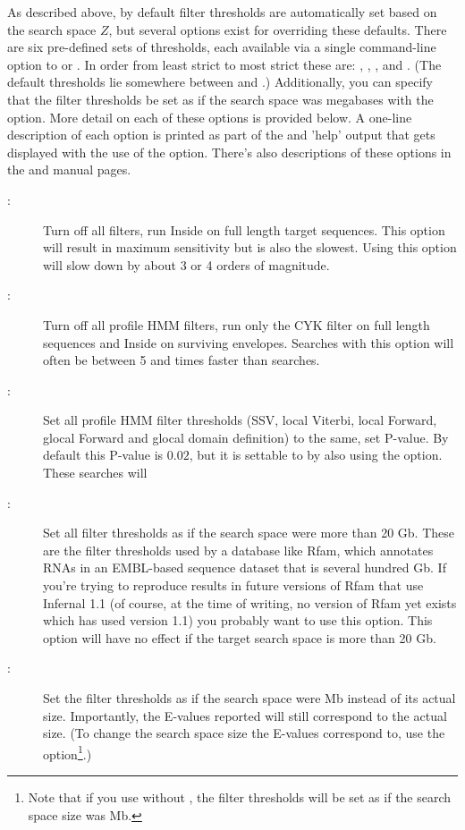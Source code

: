 As described above, by default filter thresholds are automatically set
based on the search space $Z$, but several options exist for
overriding these defaults. There are six pre-defined sets of
thresholds, each available via a single command-line option to
 or . In order from least strict to most
strict these are: , , , and
. (The default thresholds lie somewhere between
 and .) Additionally, you can specify that
the filter thresholds be set as if the search space was 
megabases with the  option. More detail on each of
these options is provided below. A one-line description of each option
is printed as part of the  and  'help'
output that gets displayed with the use of the 
option. There's also descriptions of these options in the
 and  manual pages.

\begin{description}
\item[:] Turn off all filters, run Inside on full length
  target sequences. This option will result in maximum sensitivity but
  is also the slowest. Using this option will slow down
   by about 3 or 4 orders of magnitude.
\item[:] Turn off all profile HMM filters, run only the
  CYK filter on full length sequences and Inside on surviving
  envelopes. Searches with this option will often be between 5 and
  times faster than  searches.
\item[:] Set all profile HMM filter thresholds (SSV,
  local Viterbi, local Forward, glocal Forward and glocal domain
  definition) to the same, set P-value. By default this P-value is
  $0.02$, but it is settable to  by also using the
   option. These searches will 
\item[:] Set all filter thresholds as if the search
  space were more than 20 Gb. These are the filter thresholds used by
  a database like Rfam, which annotates RNAs in an EMBL-based sequence
  dataset that is several hundred Gb. If you're trying to
  reproduce results in future versions of Rfam that use Infernal 1.1
  (of course, at the time of writing, no version of Rfam yet exists
  which has used version 1.1) you probably want to use this option.
  This option will have no effect if the target search space is more
  than 20 Gb. 
\item[:] Set the filter thresholds as if the search space
  were  Mb instead of its actual size. Importantly, the E-values
  reported will still correspond to the actual size. (To change the
  search space size the E-values correspond to, use the 
  option\footnote{Note that if you use  without
  , the filter thresholds will be set as if the
  search space size was  Mb.}.)
\end{description}

